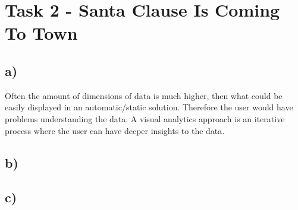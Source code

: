 \documentclass[a4paper]{article}
\begin{document}
\section*{Task 2 - Santa Clause Is Coming To Town}

\subsection*{a)} Often the amount of dimensions of data is much higher, then what could be easily displayed in an automatic/static solution. Therefore the user would have problems understanding the data. A visual analytics approach is an iterative process where the user can have deeper insights to the data.
\subsection*{b)}
\subsection*{c)}
\end{document}
